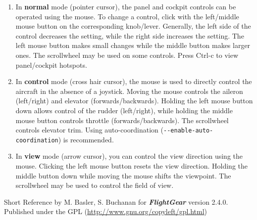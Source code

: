 \documentclass[10pt]{article}
\newcommand{\FlightGear}{{\itshape\bfseries FlightGear}}
\newcommand{\web}[1]{\href{#1}{#1}}
\begin{document}
 \begin{enumerate}
 \item In \textbf{normal} mode (pointer cursor), the panel and cockpit controls can be
 operated using the mouse. To change a control, click with the left/middle mouse button
 on the corresponding knob/lever. Generally, the left side of the control decreases the setting,
 while the right side increases the setting. The left mouse button makes small changes while the
 middle button makes larger ones. The scrollwheel may be used on some controls.
 Press Ctrl-c to view panel/cockpit hotspots.

 \item In \textbf{control} mode (cross hair cursor), the mouse is used to directly control
 the aircraft in the absence of a joystick. Moving the mouse controls the aileron (left/right)
 and elevator (forwards/backwards). Holding the left mouse button down allows control of the rudder (left/right), while holding the middle mouse button controls throttle (forwards/backwards). The scrollwheel controls
 elevator trim. Using auto-coordination (\texttt{-$ $-enable-auto-coordination}) is recommended.

 \item In \textbf{view} mode (arrow cursor), you can control the view direction using the mouse.
 Clicking the left mouse button resets the view direction. Holding the middle button down while
 moving the mouse shifts the viewpoint. The scrollwheel may be used to control the field of view.

\end{enumerate}

 \noindent
 Short Reference by M. Basler, S. Buchanan for \FlightGear{} version 2.4.0.\\
 Published under the GPL (\web{http://www.gnu.org/copyleft/gpl.html})
\end{document}

